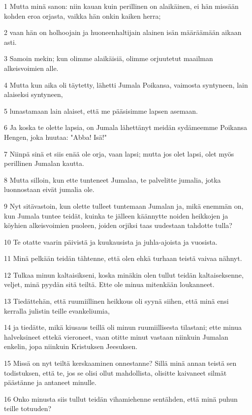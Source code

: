 \par 1 Mutta minä sanon: niin kauan kuin perillinen on alaikäinen, ei hän missään kohden eroa orjasta, vaikka hän onkin kaiken herra;
\par 2 vaan hän on holhoojain ja huoneenhaltijain alainen isän määräämään aikaan asti.
\par 3 Samoin mekin; kun olimme alaikäisiä, olimme orjuutetut maailman alkeisvoimien alle.
\par 4 Mutta kun aika oli täytetty, lähetti Jumala Poikansa, vaimosta syntyneen, lain alaiseksi syntyneen,
\par 5 lunastamaan lain alaiset, että me pääsisimme lapsen asemaan.
\par 6 Ja koska te olette lapsia, on Jumala lähettänyt meidän sydämeemme Poikansa Hengen, joka huutaa: "Abba! Isä!"
\par 7 Niinpä sinä et siis enää ole orja, vaan lapsi; mutta jos olet lapsi, olet myös perillinen Jumalan kautta.
\par 8 Mutta silloin, kun ette tunteneet Jumalaa, te palvelitte jumalia, jotka luonnostaan eivät jumalia ole.
\par 9 Nyt sitävastoin, kun olette tulleet tuntemaan Jumalan ja, mikä enemmän on, kun Jumala tuntee teidät, kuinka te jälleen käännytte noiden heikkojen ja köyhien alkeisvoimien puoleen, joiden orjiksi taas uudestaan tahdotte tulla?
\par 10 Te otatte vaarin päivistä ja kuukausista ja juhla-ajoista ja vuosista.
\par 11 Minä pelkään teidän tähtenne, että olen ehkä turhaan teistä vaivaa nähnyt.
\par 12 Tulkaa minun kaltaisikseni, koska minäkin olen tullut teidän kaltaiseksenne, veljet, minä pyydän sitä teiltä. Ette ole minua mitenkään loukanneet.
\par 13 Tiedättehän, että ruumiillinen heikkous oli syynä siihen, että minä ensi kerralla julistin teille evankeliumia,
\par 14 ja tiedätte, mikä kiusaus teillä oli minun ruumiillisesta tilastani; ette minua halveksineet ettekä vieroneet, vaan otitte minut vastaan niinkuin Jumalan enkelin, jopa niinkuin Kristuksen Jeesuksen.
\par 15 Missä on nyt teiltä kerskaaminen onnestanne? Sillä minä annan teistä sen todistuksen, että te, jos se olisi ollut mahdollista, olisitte kaivaneet silmät päästänne ja antaneet minulle.
\par 16 Onko minusta siis tullut teidän vihamiehenne sentähden, että minä puhun teille totuuden?
